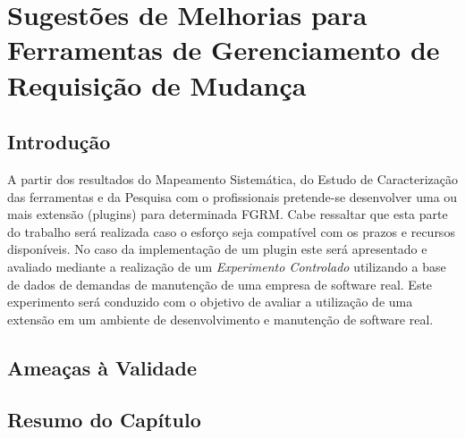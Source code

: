 \chapter{Sugestões de Melhorias para Ferramentas de Gerenciamento de Requisição de Mudança}
\label{ch:extensoes}

\section{Introdução}
A partir dos resultados do Mapeamento Sistemática, do Estudo de Caracterização
das ferramentas e da Pesquisa com o profissionais pretende-se desenvolver uma ou
mais extensão (plugins) para determinada FGRM. Cabe ressaltar que esta parte do
trabalho será realizada caso o esforço seja compatível com os prazos e recursos
disponíveis. No caso da implementação de um plugin este será apresentado e
avaliado mediante a realização de um \textit{Experimento Controlado}
\cite{wohlin2012experimentation} utilizando a base de dados de demandas de
manutenção de uma empresa de software real. Este experimento será conduzido com
o objetivo de avaliar a utilização de uma extensão em um ambiente de
desenvolvimento e manutenção de software real.

\section{Ameaças à Validade}

\section{Resumo do Capítulo}
